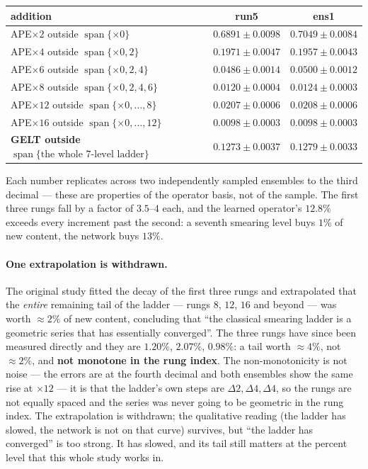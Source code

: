 \documentclass[11pt,a4paper]{article}
\newcommand{\spn}{\operatorname{span}}
\begin{document}
\begin{center}\small
\begin{tabular}{@{}lcc@{}}
\toprule
addition & run5 & ens1 \\
\midrule
APE$\times2$ outside $\spn\{\times0\}$ & $0.6891 \pm 0.0098$ & $0.7049 \pm 0.0084$ \\
APE$\times4$ outside $\spn\{\times0,2\}$ & $0.1971 \pm 0.0047$ & $0.1957 \pm 0.0043$ \\
APE$\times6$ outside $\spn\{\times0,2,4\}$ & $0.0486 \pm 0.0014$ & $0.0500 \pm 0.0012$ \\
APE$\times8$ outside $\spn\{\times0,2,4,6\}$ & $0.0120 \pm 0.0004$ & $0.0124 \pm 0.0003$ \\
APE$\times12$ outside $\spn\{\times0,\dots,8\}$ & $0.0207 \pm 0.0006$ & $0.0208 \pm 0.0006$ \\
APE$\times16$ outside $\spn\{\times0,\dots,12\}$ & $0.0098 \pm 0.0003$ & $0.0098 \pm 0.0003$ \\
\midrule
\textbf{GELT outside $\spn\{\text{the whole 7-level ladder}\}$}
  & $\mathbf{0.1273 \pm 0.0037}$ & $\mathbf{0.1279 \pm 0.0033}$ \\
\bottomrule
\end{tabular}
\end{center}

Each number replicates across two independently sampled ensembles to the third
decimal --- these are properties of the operator basis, not of the sample. The
first three rungs fall by a factor of $3.5$--$4$ each, and the learned
operator's $12.8\%$ exceeds every increment past the second: a seventh smearing
level buys $1\%$ of new content, the network buys $13\%$.

\paragraph{One extrapolation is withdrawn.} The original study fitted the decay
of the first three rungs and extrapolated that the \emph{entire} remaining tail
of the ladder --- rungs $8$, $12$, $16$ and beyond --- was worth $\approx 2\%$ of
new content, concluding that ``the classical smearing ladder is a geometric
series that has essentially converged''. The three rungs have since been
measured directly and they are $1.20\%$, $2.07\%$, $0.98\%$: a tail worth
$\approx 4\%$, not $\approx 2\%$, and \textbf{not monotone in the rung index}.
The non-monotonicity is not noise --- the errors are at the fourth decimal and
both ensembles show the same rise at $\times12$ --- it is that the ladder's own
steps are $\Delta2, \Delta4, \Delta4$, so the rungs are not equally spaced and
the series was never going to be geometric in the rung index. The extrapolation
is withdrawn; the qualitative reading (the ladder has slowed, the network is not
on that curve) survives, but ``the ladder has converged'' is too strong. It has
slowed, and its tail still matters at the percent level that this whole study
works in.
\end{document}
